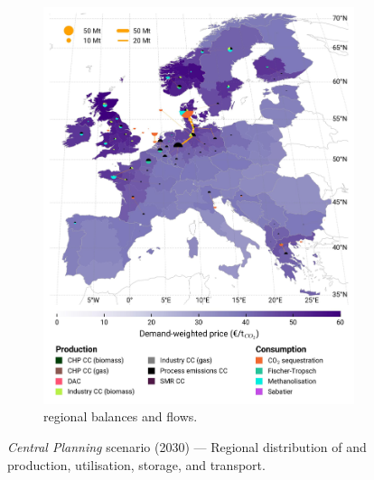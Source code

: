 \documentclass[preprint,12pt,sort&compress]{elsarticle}
\begin{document}
\begin{figure}[htbp]
\begin{subfigure}[t]{0.49\textwidth}
      \includegraphics[width=1\textwidth]{maps/greenfield-pipelines/base_s_adm___2030-balance_map_co2_stored} 
      \vspace{-0.7cm}
      \caption{ regional balances and flows.}
      \label{fig:CP_lt_2030_co2}
  \end{subfigure}
  \caption{\textit{Central Planning} scenario (2030) --- Regional distribution of  and  production, utilisation, storage, and transport.}
  \label{fig:CP_lt_2030}
\end{figure}
\end{document}

